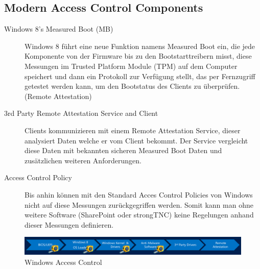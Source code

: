 \subsection{Modern Access Control Components}
\begin{description}
    \item[Windows 8's Measured Boot (MB)] Windows 8 führt eine neue Funktion namens Measured Boot ein, die jede Komponente von der Firmware bis zu den Bootstarttreibern misst, diese Messungen im Trusted Platform Module (TPM) auf dem Computer speichert und dann ein Protokoll zur Verfügung stellt, das per Fernzugriff getestet werden kann, um den Bootstatus des Clients zu überprüfen. (Remote Attestation)
    \item[3rd Party Remote Attestation Service and Client] Clients kommunizieren mit einem Remote Attestation Service, dieser analysiert Daten welche er vom Client bekommt. Der Service vergleicht diese Daten mit bekannten sicheren Measured Boot Daten und zusätzlichen weiteren Anforderungen. 
    \item[Access Control Policy] Bis anhin können mit den Standard Acces Control Policies von Windows nicht auf diese Messungen zurückgegriffen werden. Somit kann man ohne weitere Software (SharePoint oder strongTNC) keine Regelungen anhand dieser Messungen definieren.
\end{description}
\begin{figure}[h]
\centering
\includegraphics[width=1.0\linewidth]{images/access-control-components.png}
\caption{Windows Access Control}
\label{fig:accesscontrol}
\end{figure}




